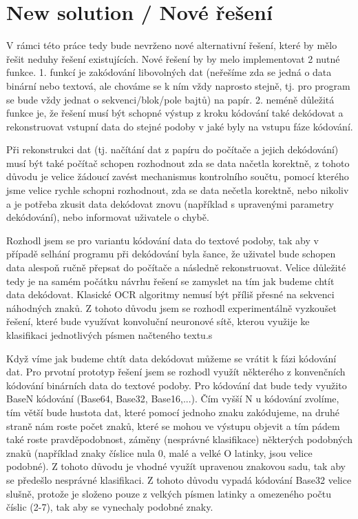 \documentclass[conference]{IEEEtran}
\begin{document}
\section{New solution / Nové řešení}

V rámci této práce tedy bude nevrženo nové alternativní řešení, které by mělo řešit neduhy řešení existujících. Nové řešení by by melo implementovat 2 nutné funkce. 1. funkcí je zakódování libovolných dat (neřešíme zda se jedná o data binární nebo textová, ale chováme se k ním vždy naprosto stejně, tj. pro program se bude vždy jednat o sekvenci/blok/pole bajtů) na papír. 2. neméně důležitá funkce je, že řešení musí být schopné výstup z kroku kódování také dekódovat a rekonstruovat vstupní data do stejné podoby v jaké byly na vstupu fáze kódování. 

Při rekonstrukci dat (tj. načítání dat z papíru do počítače a jejich dekódování) musí být také počítač schopen rozhodnout zda se data načetla korektně, z tohoto důvodu je velice žádoucí zavést mechanismus kontrolního součtu, pomocí kterého jsme velice rychle schopni rozhodnout, zda se data nečetla korektně, nebo nikoliv a je potřeba zkusit data dekódovat znovu (například s upravenými parametry dekódování), nebo informovat uživatele o chybě.

Rozhodl jsem se pro variantu kódování data do textové podoby, tak aby v případě selhání programu při dekódování byla šance, že uživatel bude schopen data alespoň ručně přepsat do počítače a následně rekonstruovat. Velice důležité tedy je na samém počátku návrhu řešení se zamyslet na tím jak budeme chtít data dekódovat. Klasické OCR algoritmy nemusí být příliš přesné na sekvenci náhodných znaků. Z tohoto důvodu jsem se rozhodl experimentálně vyzkoušet řešení, které bude využívat konvoluční neuronové sítě, kterou využije ke klasifikaci jednotlivých písmen načteného textu.s

Když víme jak budeme chtít data dekódovat můžeme se vrátit k fázi kódování dat. Pro prvotní prototyp řešení jsem se rozhodl využít některého z konvenčních kódování binárních data do textové podoby. Pro kódování dat bude tedy využito BaseN kódování \cite{RFC4648} (Base64, Base32, Base16,...). Čím vyšší N u kódování zvolíme, tím větší bude hustota dat, které pomocí jednoho znaku zakódujeme, na druhé straně nám roste počet znaků, které se mohou ve výstupu objevit a tím pádem také roste pravděpodobnost, záměny (nesprávné klasifikace) některých podobných znaků (například znaky číslice nula 0, malé a velké O latinky, jsou velice podobné). Z tohoto důvodu je vhodné využít upravenou znakovou sadu, tak aby se předešlo nesprávné klasifikaci. Z tohoto důvodu vypadá kódování Base32 velice slušně, protože je složeno pouze z velkých písmen latinky a omezeného počtu číslic (2-7), tak aby se vynechaly podobné znaky.
\end{document}

